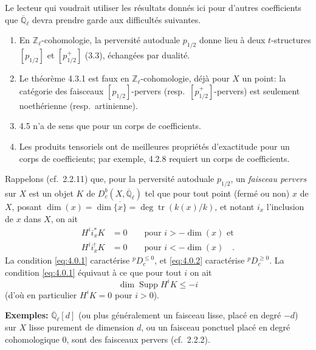 \documentclass[12pt,a4paper]{article}
\theoremstyle{plain}
\theoremstyle{definition}
\DeclareMathOperator{\Supp}{Supp}
\DeclareMathOperator{\tr}{tr}
\begin{document}
Le lecteur qui voudrait utiliser les r\'{e}sultats donn\'{e}s ici pour d'autres coefficients que $\overline{\mathbb{Q}}_{\ell}$ devra prendre garde aux difficult\'{e}s suivantes.
\begin{enumerate}
\item[(a)] En $\mathbb{Z}_{\ell}$-cohomologie, la perversit\'{e} autoduale $p_{1/2}$ donne lieu \`{a} deux $t$-structures $[p_{1/2}]$ et $[p_{1/2}^{+}]$ (3.3), \'{e}chang\'{e}es par dualit\'{e}.
\item[(b)] Le th\'{e}or\`{e}me 4.3.1 est faux en $\mathbb{Z}_{\ell}$-cohomologie, d\'{e}j\`{a} pour $X$ un point: la cat\'{e}gorie des faisceaux $[p_{1/2}]$-pervers (resp.\ $[p_{1/2}^{+}]$-pervers) est seulement noeth\'{e}rienne (resp.\ artinienne).
\item[(c)] 4.5 n'a de sens que pour un corps de coefficients.
\item[(d)] Les produits tensoriels ont de meilleures propri\'{e}t\'{e}s d'exactitude pour un corps de coefficients; par exemple, 4.2.8 requiert un corps de coefficients.
\end{enumerate}

Rappelons (cf.\ 2.2.11) que, pour la perversit\'{e} autoduale $p_{1/2}$, un \emph{faisceau pervers} sur $X$ est un objet $K$ de $D_{c}^{b}(X,\overline{\mathbb{Q}}_{\ell})$ tel que pour tout point (ferm\'{e} ou non) $x$ de $X$, posant $\dim(x) = \dim\overline{\{x\}} = \deg \tr(k(x)/k)$, et notant $i_{x}$ l'inclusion de $x$ dans $X$, on ait
\begin{align}
H^{i}i_{x}^{*}K &= 0 \qquad \text{pour } i > -\dim(x) \text{ et} \label{eq:4.0.1} \\
H^{i}i_{x}^{!}K &= 0 \qquad \text{pour } i < -\dim(x)\quad. \label{eq:4.0.2}
\end{align}
La condition \eqref{eq:4.0.1} caract\'{e}rise ${}^{p}D_{c}^{\leq 0}$, et \eqref{eq:4.0.2} caract\'{e}rise ${}^{p}D_{c}^{\geq 0}$. La condition \eqref{eq:4.0.1} \'{e}quivaut \`{a} ce que pour tout $i$ on ait
\begin{equation}\label{eq:4.0.1prime}
\dim \Supp H^{i}K \leq -i
\end{equation}
(d'o\`{u} en particulier $H^{i}K = 0$ pour $i > 0$).

\noindent\textbf{Exemples:} $\overline{\mathbb{Q}}_{\ell}[d]$ (ou plus g\'{e}n\'{e}ralement un faisceau lisse, plac\'{e} en degr\'{e} $-d$) sur $X$ lisse purement de dimension $d$, ou un faisceau ponctuel plac\'{e} en degr\'{e} cohomologique $0$, sont des faisceaux pervers (cf.\ 2.2.2).
\end{document}
